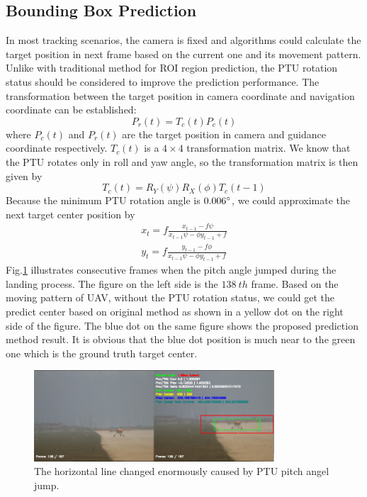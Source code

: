 \subsection{Bounding Box Prediction}
In most tracking scenarios, the camera is fixed and algorithms could calculate the target position in next frame based on the current one and its movement pattern. Unlike with traditional method for ROI region prediction, the PTU rotation status should be considered to improve the prediction performance. The transformation between the target position in camera coordinate and navigation coordinate can be established:
\begin{equation}
P_r(t) = T_c(t) P_c(t)
\end{equation}
where $P_c(t)$ and $P_r(t)$ are the target position in camera and guidance coordinate respectively. $T_c(t)$ is a $4 \times 4$ transformation matrix. We know that the PTU rotates only in roll and yaw angle, so the transformation matrix is then given by 
\begin{equation}
T_c(t) = R_Y(\psi)R_X(\phi)T_c(t-1)
\end{equation}
Because the minimum PTU rotation angle is $0.006 \degree$, we could approximate the next target center position by
\begin{align}
\label{eq:prev_predict_curr}
x_{t} = f\frac{x_{t-1} - f\psi }{x_{t-1}  \psi  - \phi y_{t-1} + f} \\
y_{t} = f\frac{y_{t-1} -f\phi}{  x_{t-1} \psi - \phi y_{t-1} + f}
\end{align}
Fig.\ref{fig:chp04_17_predict_1} illustrates consecutive frames when the pitch angle jumped during the landing process. The figure on the left side is the $138\ th$ frame. Based on the moving pattern of UAV, without the PTU rotation status, we could get the predict center based on original method as shown in a yellow dot on the right side of the figure. The blue dot on the same figure shows the proposed prediction method result. It is obvious that the blue dot position is much near to the green one which is the ground truth target center.
 
\begin{figure}[!th]
	\centering
	\includegraphics[width=0.8\textwidth]{Figs/chp04_17_predict_1.pdf}
	\caption{The horizontal line changed enormously caused by PTU pitch angel jump. }
	\label{fig:chp04_17_predict_1}    
\end{figure}


